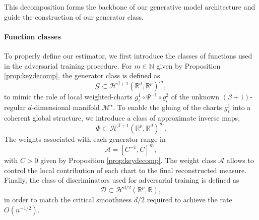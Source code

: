 \documentclass[10pt]{article}
\begin{document}
This decomposition forms the backbone of our generative model architecture and guide the construction of our generator class.

\paragraph{Function classes} To properly define our estimator, we first introduce the classes of functions used in the adversarial training procedure. For $m\in \mathbb{N}$ given by Proposition \ref{prop:keydecomp},
the generator class is defined as
\begin{equation}\label{eq:G}
\mathcal{G} \subset \mathcal{H}^{\beta+1}(\mathbb{R}^d, \mathbb{R}^p)^m,
\end{equation}
to mimic the role of local weighted-charts $g_i^1\circ \Psi^{-1}\circ g_i^2$ of the unknown $(\beta+1)$-regular $d$-dimensional manifold $\mathcal{M}^\star$. To enable the gluing of the charts $g_i^1$ into a coherent global structure, we introduce a class of approximate inverse maps,
\begin{equation}\label{eq:phi}
\Phi \subset \mathcal{H}^{\beta+1}(\mathbb{R}^p, \mathbb{R}^d)^m.
\end{equation}
The weights associated with each generator range in
\begin{equation}\label{eq:A}
\mathcal{A} = [C^{-1},C]^m,
\end{equation}
with $C>0$ given by Proposition \ref{prop:keydecomp}.
The weight class $\mathcal{A}$ allows to  control the local contribution of each chart to the final reconstructed measure. Finally, the class of discriminators used for adversarial training is defined as
\begin{equation}\label{eq:D}
\mathcal{D} \subset \mathcal{H}^{d/2}(\mathbb{R}^p, \mathbb{R}),
\end{equation}
in order to match the critical smoothness $d/2$ required to achieve the rate $O(n^{-1/2})$.
\end{document}
